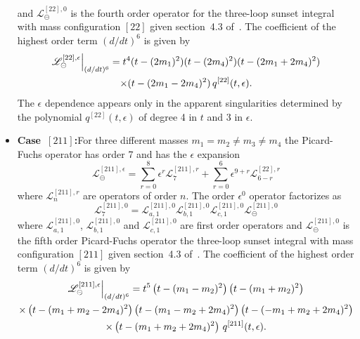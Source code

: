 \documentclass[a4paper,12pt]{article}
\numberwithin{equation}{section}
\numberwithin{figure}{section}
\def\su{\circleddash}
\begin{document}
\begin{itemize}
       and $\mathscr{L}^{[22],0}_\su$ is the fourth order operator for the
       three-loop sunset integral with mass configuration $[22]$ given  section~4.3 of~\cite{Lairez:2022zkj}.
    The coefficient of the highest order term $(d/dt)^6$    is given by
       \begin{multline}
                   \mathscr{L}^{[22],\epsilon}_\su\Big\vert_{(d/dt)^6}=
                   t^4(t-(2m_1)^2)(t-(2m_4)^2)(t-(2m_1+2m_4)^2)\cr\times(t-(2m_1-2m_4)^2)
                   \, q^{[22]}(t,\epsilon).
                 \end{multline}
                 The $\epsilon$ dependence appears only in the
                 apparent singularities determined by the polynomial
                 $q^{[22]}(t,\epsilon)$ of degree 4 in $t$ and $3$ in $\epsilon$.
     \item   {\bf Case~$[211]$:}For three different masses $m_1=m_2\neq m_3 \neq m_4$ the
  Picard-Fuchs operator has order 7 and has the $\epsilon$ expansion
  \begin{equation}
    \mathscr{L}^{[211],\epsilon}_\su=       \sum_{r=0}^8 \epsilon^r
    \mathscr{L}^{[211],r}_{7}+  \sum_{r=0}^6 \epsilon^{9+r}   \mathscr{L}^{[22],r}_{6-r}
  \end{equation}
   where  $ \mathscr{L}^{[211],r}_{n}$ 
  are operators of order $n$.
    The order $\epsilon^0$ operator factorizes as
  \begin{equation}
         \mathscr{L}^{[211],0}_{7}=   \mathscr{L}^{[211],0}_{a,1}  \mathscr{L}^{[211],0}_{b,1} \mathscr{L}^{[211],0}_{c,1}\mathscr{L}^{[211],0}_\su
       \end{equation}
        where  $ \mathscr{L}^{[211],0}_{a,1}$,  $
        \mathscr{L}^{[211],0}_{b,1}$ and  $ \mathscr{L}^{[211],0}_{c,1}$ are  first order operators
       and $\mathscr{L}^{[211],0}_\su$ is the fifth order Picard-Fuchs operator the
       three-loop sunset integral with mass configuration $[211]$
       given section~4.3 of~\cite{Lairez:2022zkj}.   The coefficient of the highest order term $(d/dt)^6$    is given by
       \begin{multline}
                   \mathscr{L}^{[211],\epsilon}_\su\Big\vert_{(d/dt)^6}=
                   t^5\left(t-(m_{1}-m_{2})^2\right) \left(t-(m_{1}+m_{2})^2\right)\cr\times
   \left(t-(m_{1}+m_{2}-2 m_{4})^2\right) \left(t-(m_{1}-m_{2}+2
   m_{4})^2\right) \left(t-(-m_{1}+m_{2}+2 m_{4})^2\right)\cr\times
   \left(t-(m_{1}+m_{2}+2 m_{4})^2\right)
                   \, q^{[211]}(t,\epsilon).
                 \end{multline}

\end{itemize}
\end{document}
